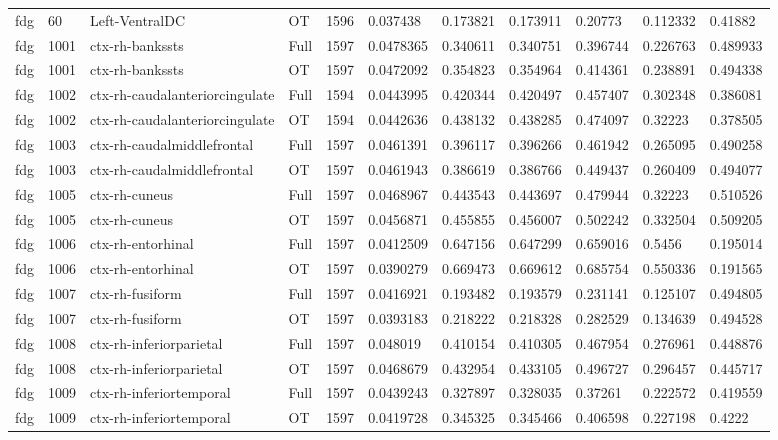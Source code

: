 \begin{landscape}
\begin{longtable}{lllllllllll}
fdg & 60 & Left-VentralDC & OT & 1596 & 0.037438 & 0.173821 & 0.173911 & 0.20773 & 0.112332 & 0.41882 \\
fdg & 1001 & ctx-rh-bankssts & Full & 1597 & 0.0478365 & 0.340611 & 0.340751 & 0.396744 & 0.226763 & 0.489933 \\
fdg & 1001 & ctx-rh-bankssts & OT & 1597 & 0.0472092 & 0.354823 & 0.354964 & 0.414361 & 0.238891 & 0.494338 \\
fdg & 1002 & ctx-rh-caudalanteriorcingulate & Full & 1594 & 0.0443995 & 0.420344 & 0.420497 & 0.457407 & 0.302348 & 0.386081 \\
fdg & 1002 & ctx-rh-caudalanteriorcingulate & OT & 1594 & 0.0442636 & 0.438132 & 0.438285 & 0.474097 & 0.32223 & 0.378505 \\
fdg & 1003 & ctx-rh-caudalmiddlefrontal & Full & 1597 & 0.0461391 & 0.396117 & 0.396266 & 0.461942 & 0.265095 & 0.490258 \\
fdg & 1003 & ctx-rh-caudalmiddlefrontal & OT & 1597 & 0.0461943 & 0.386619 & 0.386766 & 0.449437 & 0.260409 & 0.494077 \\
fdg & 1005 & ctx-rh-cuneus & Full & 1597 & 0.0468967 & 0.443543 & 0.443697 & 0.479944 & 0.32223 & 0.510526 \\
fdg & 1005 & ctx-rh-cuneus & OT & 1597 & 0.0456871 & 0.455855 & 0.456007 & 0.502242 & 0.332504 & 0.509205 \\
fdg & 1006 & ctx-rh-entorhinal & Full & 1597 & 0.0412509 & 0.647156 & 0.647299 & 0.659016 & 0.5456 & 0.195014 \\
fdg & 1006 & ctx-rh-entorhinal & OT & 1597 & 0.0390279 & 0.669473 & 0.669612 & 0.685754 & 0.550336 & 0.191565 \\
fdg & 1007 & ctx-rh-fusiform & Full & 1597 & 0.0416921 & 0.193482 & 0.193579 & 0.231141 & 0.125107 & 0.494805 \\
fdg & 1007 & ctx-rh-fusiform & OT & 1597 & 0.0393183 & 0.218222 & 0.218328 & 0.282529 & 0.134639 & 0.494528 \\
fdg & 1008 & ctx-rh-inferiorparietal & Full & 1597 & 0.048019 & 0.410154 & 0.410305 & 0.467954 & 0.276961 & 0.448876 \\
fdg & 1008 & ctx-rh-inferiorparietal & OT & 1597 & 0.0468679 & 0.432954 & 0.433105 & 0.496727 & 0.296457 & 0.445717 \\
fdg & 1009 & ctx-rh-inferiortemporal & Full & 1597 & 0.0439243 & 0.327897 & 0.328035 & 0.37261 & 0.222572 & 0.419559 \\
fdg & 1009 & ctx-rh-inferiortemporal & OT & 1597 & 0.0419728 & 0.345325 & 0.345466 & 0.406598 & 0.227198 & 0.4222 \\

\end{longtable}
\end{landscape}
